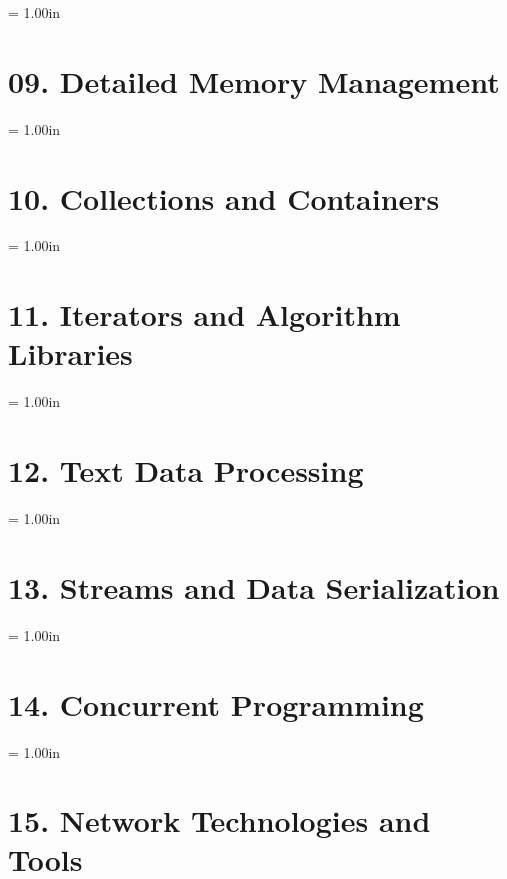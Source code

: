 \documentclass[a4paper,12pt]{article}
\begin{document}
\bigskip\medskip






\newpage\thispagestyle{empty}\pdfpageheight = 1.00in\enlargethispage{100in}

\section{09. Detailed Memory Management}



\newpage\thispagestyle{empty}\pdfpageheight = 1.00in\enlargethispage{100in}

\section{10. Collections and Containers}



\newpage\thispagestyle{empty}\pdfpageheight = 1.00in\enlargethispage{100in}

\section{11. Iterators and Algorithm Libraries}



\newpage\thispagestyle{empty}\pdfpageheight = 1.00in\enlargethispage{100in}

\section{12. Text Data Processing}



\newpage\thispagestyle{empty}\pdfpageheight = 1.00in\enlargethispage{100in}

\section{13. Streams and Data Serialization}



\newpage\thispagestyle{empty}\pdfpageheight = 1.00in\enlargethispage{100in}

\section{14. Concurrent Programming}



\newpage\thispagestyle{empty}\pdfpageheight = 1.00in\enlargethispage{100in}

\section{15. Network Technologies and Tools}
\end{document}

